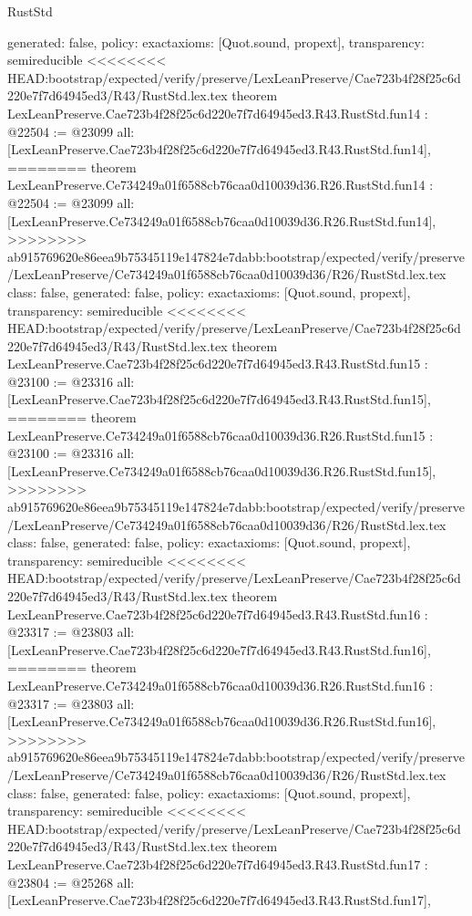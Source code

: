 \begin{lexlean}{RustStd}
\begin{coremodule}
{\begin{coremodule}
{{{{{{{{{{{{{{{{{  generated: false,
  policy: exact{axioms: [Quot.sound, propext]},
  transparency: semireducible
}
<<<<<<<< HEAD:bootstrap/expected/verify/preserve/LexLeanPreserve/Cae723b4f28f25c6d220e7f7d64945ed3/R43/RustStd.lex.tex
theorem LexLeanPreserve.Cae723b4f28f25c6d220e7f7d64945ed3.R43.RustStd.fun14 : @22504 := @23099 {
  all: [LexLeanPreserve.Cae723b4f28f25c6d220e7f7d64945ed3.R43.RustStd.fun14],
========
theorem LexLeanPreserve.Ce734249a01f6588cb76caa0d10039d36.R26.RustStd.fun14 : @22504 := @23099 {
  all: [LexLeanPreserve.Ce734249a01f6588cb76caa0d10039d36.R26.RustStd.fun14],
>>>>>>>> ab915769620e86eea9b75345119e147824e7dabb:bootstrap/expected/verify/preserve/LexLeanPreserve/Ce734249a01f6588cb76caa0d10039d36/R26/RustStd.lex.tex
  class: false,
  generated: false,
  policy: exact{axioms: [Quot.sound, propext]},
  transparency: semireducible
}
<<<<<<<< HEAD:bootstrap/expected/verify/preserve/LexLeanPreserve/Cae723b4f28f25c6d220e7f7d64945ed3/R43/RustStd.lex.tex
theorem LexLeanPreserve.Cae723b4f28f25c6d220e7f7d64945ed3.R43.RustStd.fun15 : @23100 := @23316 {
  all: [LexLeanPreserve.Cae723b4f28f25c6d220e7f7d64945ed3.R43.RustStd.fun15],
========
theorem LexLeanPreserve.Ce734249a01f6588cb76caa0d10039d36.R26.RustStd.fun15 : @23100 := @23316 {
  all: [LexLeanPreserve.Ce734249a01f6588cb76caa0d10039d36.R26.RustStd.fun15],
>>>>>>>> ab915769620e86eea9b75345119e147824e7dabb:bootstrap/expected/verify/preserve/LexLeanPreserve/Ce734249a01f6588cb76caa0d10039d36/R26/RustStd.lex.tex
  class: false,
  generated: false,
  policy: exact{axioms: [Quot.sound, propext]},
  transparency: semireducible
}
<<<<<<<< HEAD:bootstrap/expected/verify/preserve/LexLeanPreserve/Cae723b4f28f25c6d220e7f7d64945ed3/R43/RustStd.lex.tex
theorem LexLeanPreserve.Cae723b4f28f25c6d220e7f7d64945ed3.R43.RustStd.fun16 : @23317 := @23803 {
  all: [LexLeanPreserve.Cae723b4f28f25c6d220e7f7d64945ed3.R43.RustStd.fun16],
========
theorem LexLeanPreserve.Ce734249a01f6588cb76caa0d10039d36.R26.RustStd.fun16 : @23317 := @23803 {
  all: [LexLeanPreserve.Ce734249a01f6588cb76caa0d10039d36.R26.RustStd.fun16],
>>>>>>>> ab915769620e86eea9b75345119e147824e7dabb:bootstrap/expected/verify/preserve/LexLeanPreserve/Ce734249a01f6588cb76caa0d10039d36/R26/RustStd.lex.tex
  class: false,
  generated: false,
  policy: exact{axioms: [Quot.sound, propext]},
  transparency: semireducible
}
<<<<<<<< HEAD:bootstrap/expected/verify/preserve/LexLeanPreserve/Cae723b4f28f25c6d220e7f7d64945ed3/R43/RustStd.lex.tex
theorem LexLeanPreserve.Cae723b4f28f25c6d220e7f7d64945ed3.R43.RustStd.fun17 : @23804 := @25268 {
  all: [LexLeanPreserve.Cae723b4f28f25c6d220e7f7d64945ed3.R43.RustStd.fun17],
}}}}}}}}}}}}}}}}}}}}
\end{coremodule}}
\end{coremodule}
\end{lexlean}
